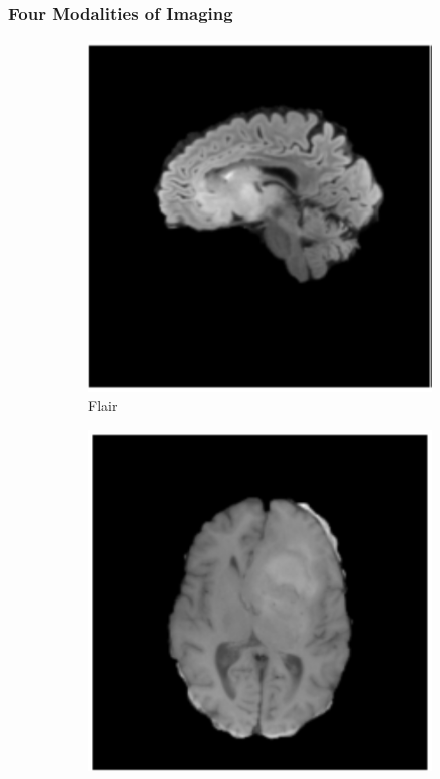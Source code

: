 \documentclass[a4paper,12pt]{extarticle}
\begin{document}
\subsubsection{Four Modalities of Imaging}
\begin{figure}[H]
    \centering
    \begin{subfigure}[b]{0.24\linewidth}
        \includegraphics[width=\linewidth]{figure/flair.png}
        \caption{Flair}
        \label{fig:img1}
    \end{subfigure}
    \begin{subfigure}[b]{0.24\linewidth}
        \includegraphics[width=\linewidth]{figure/t1w.png}

\end{subfigure}
\end{figure}
\end{document}
